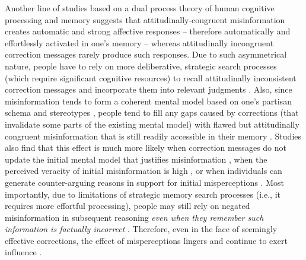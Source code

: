\documentclass[man, 12pt, a4paper, noextraspace]{apa6}
\begin{document}
      Another line of studies based on a dual process theory of human cognitive processing and memory suggests that attitudinally-congruent misinformation creates automatic and strong affective responses -- therefore automatically and effortlessly activated in one's memory -- whereas attitudinally incongruent correction messages rarely produce such responses. Due to such asymmetrical nature, people have to rely on more deliberative, strategic search processes (which require significant cognitive resources) to recall attitudinally inconsistent correction messages and incorporate them into relevant judgments \parencite{thorson_2016, Lewandowsky_2012PSPI}. Also, since misinformation tends to form a coherent mental model based on one's partisan schema and stereotypes \parencite[e.g.,][]{garrett2013undermining}, people tend to fill any gaps caused by corrections (that invalidate some parts of the existing mental model) with flawed but attitudinally congruent misinformation that is still readily accessible in their memory \parencite{Lewandowsky_2012PSPI}. Studies also find that this effect is much more likely when correction messages do not update the initial mental model that justifies misinformation \parencite{Chan_debunking_meta_2017}, when the perceived veracity of initial misinformation is high \parencite[due to fluency bias in one's cognitive processing:][]{Lewandowsky_2012PSPI}, or when individuals can generate counter-arguing reasons in support for initial misperceptions \parencite{garrett2013undermining, Chan_debunking_meta_2017}. Most importantly, due to limitations of strategic memory search processes (i.e., it requires more effortful processing), people may still rely on negated misinformation in subsequent reasoning \emph{even when they remember such information is factually incorrect} \parencite{Lewandowsky_2012PSPI}. Therefore, even in the face of seemingly effective corrections, the effect of misperceptions lingers and continue to exert influence \parencite{thorson_2016}.  
      
\end{document}
